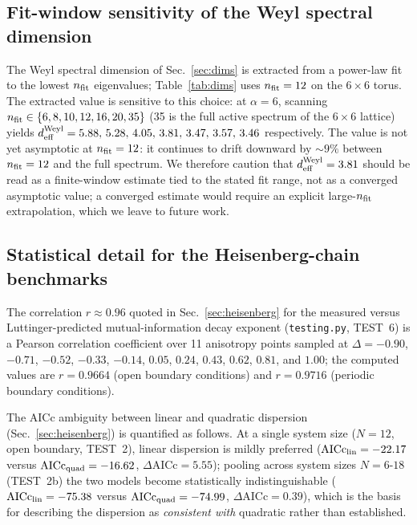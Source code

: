 \documentclass[reprint,superscriptaddress,amsmath,amssymb,aps,prd,showkeys,nofootinbib]{revtex4-2}
\begin{document}
\subsection{Fit-window sensitivity of the Weyl spectral dimension}
\label{app:weyl-window}
The Weyl spectral dimension of Sec.~\ref{sec:dims} is extracted from a power-law fit to the
lowest $n_{\rm fit}$ eigenvalues; Table~\ref{tab:dims} uses $n_{\rm fit}=12$ on the
$6\times6$ torus. The extracted value is sensitive to this choice: at $\alpha=6$, scanning
$n_{\rm fit}\in\{6,8,10,12,16,20,35\}$ (35 is the full active spectrum of the $6\times6$
lattice) yields $d_{\rm eff}^{\rm Weyl}=5.88,\,5.28,\,4.05,\,3.81,\,3.47,\,3.57,\,3.46$
respectively. The value is not yet asymptotic at $n_{\rm fit}=12$: it continues to drift
downward by $\sim9\%$ between $n_{\rm fit}=12$ and the full spectrum. We therefore caution
that $d_{\rm eff}^{\rm Weyl}=3.81$ should be read as a finite-window estimate tied to the
stated fit range, not as a converged asymptotic value; a converged estimate would require an
explicit large-$n_{\rm fit}$ extrapolation, which we leave to future work.

\subsection{Statistical detail for the Heisenberg-chain benchmarks}
\label{app:heisenberg-stats}
The correlation $r\approx0.96$ quoted in Sec.~\ref{sec:heisenberg} for the measured versus
Luttinger-predicted mutual-information decay exponent (\texttt{testing.py}, TEST~6) is a
Pearson correlation coefficient over 11 anisotropy points sampled at $\Delta=-0.90$,
$-0.71$, $-0.52$, $-0.33$, $-0.14$, $0.05$, $0.24$, $0.43$, $0.62$, $0.81$, and $1.00$; the
computed values are $r=0.9664$ (open boundary conditions) and $r=0.9716$ (periodic boundary
conditions).

The AICc ambiguity between linear and quadratic dispersion (Sec.~\ref{sec:heisenberg}) is
quantified as follows. At a single system size ($N=12$, open boundary, TEST~2), linear
dispersion is mildly preferred ($\mathrm{AICc}_{\rm lin}=-22.17$ versus
$\mathrm{AICc}_{\rm quad}=-16.62$, $\Delta\mathrm{AICc}=5.55$); pooling across system sizes
$N=6$-$18$ (TEST~2b) the two models become statistically indistinguishable
($\mathrm{AICc}_{\rm lin}=-75.38$ versus $\mathrm{AICc}_{\rm quad}=-74.99$,
$\Delta\mathrm{AICc}=0.39$), which is the basis for describing the dispersion as
\emph{consistent with} quadratic rather than established.
\end{document}
